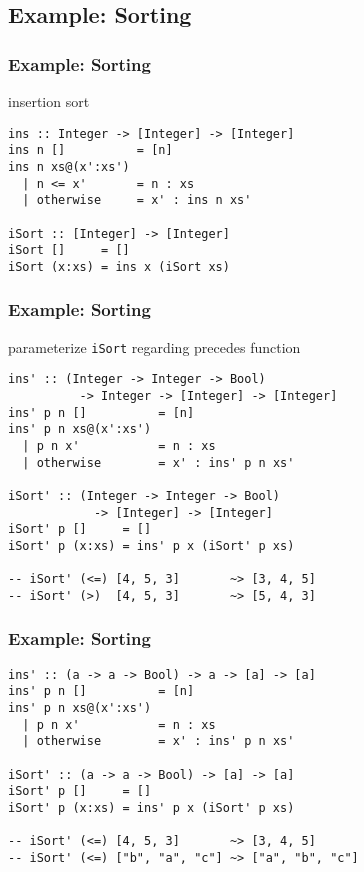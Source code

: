 \documentclass[dvipsnames]{beamer}
\theoremstyle{plain}
\begin{document}
\subsection{Example: Sorting}

\begin{frame}[fragile]
  \frametitle{Example: Sorting}

  \begin{exampleblock}{insertion sort}
    \begin{lstlisting}
ins :: Integer -> [Integer] -> [Integer]
ins n []          = [n]
ins n xs@(x':xs')
  | n <= x'       = n : xs
  | otherwise     = x' : ins n xs'

iSort :: [Integer] -> [Integer]
iSort []     = []
iSort (x:xs) = ins x (iSort xs)
    \end{lstlisting}
  \end{exampleblock}
\end{frame}

\begin{frame}[fragile]
  \frametitle{Example: Sorting}

  \begin{exampleblock}{parameterize \lstinline|iSort| regarding precedes
      function}
    \begin{lstlisting}
ins' :: (Integer -> Integer -> Bool)
          -> Integer -> [Integer] -> [Integer]
ins' p n []          = [n]
ins' p n xs@(x':xs')
  | p n x'           = n : xs
  | otherwise        = x' : ins' p n xs'

iSort' :: (Integer -> Integer -> Bool)
            -> [Integer] -> [Integer]
iSort' p []     = []
iSort' p (x:xs) = ins' p x (iSort' p xs)

-- iSort' (<=) [4, 5, 3]       ~> [3, 4, 5]
-- iSort' (>)  [4, 5, 3]       ~> [5, 4, 3]
    \end{lstlisting}
  \end{exampleblock}
\end{frame}

\begin{frame}[fragile]
  \frametitle{Example: Sorting}

  \begin{exampleblock}{}
    \begin{lstlisting}
ins' :: (a -> a -> Bool) -> a -> [a] -> [a]
ins' p n []          = [n]
ins' p n xs@(x':xs')
  | p n x'           = n : xs
  | otherwise        = x' : ins' p n xs'

iSort' :: (a -> a -> Bool) -> [a] -> [a]
iSort' p []     = []
iSort' p (x:xs) = ins' p x (iSort' p xs)

-- iSort' (<=) [4, 5, 3]       ~> [3, 4, 5]
-- iSort' (<=) ["b", "a", "c"] ~> ["a", "b", "c"]
    \end{lstlisting}
  \end{exampleblock}
\end{frame}
\end{document}
